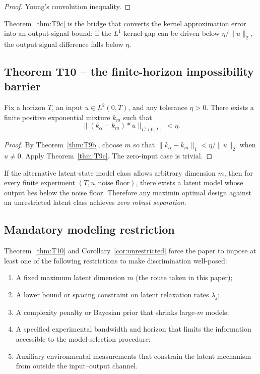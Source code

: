 \begin{proof}
Young's convolution inequality.
\end{proof}

Theorem~\ref{thm:T9c} is the bridge that converts the kernel approximation error into an output-signal bound: if the \(L^1\) kernel gap can be driven below \(\eta / \|u\|_2\), the output signal difference falls below \(\eta\).

\subsection{Theorem T10 -- the finite-horizon impossibility barrier}

\begin{theorem}
\label{thm:T10}
Fix a horizon \(T\), an input \(u \in L^2(0,T)\), and any tolerance \(\eta > 0\). There exists a finite positive exponential mixture \(k_m\) such that
\[
\|(k_\alpha - k_m) * u\|_{L^2(0,T)} < \eta.
\]
\end{theorem}

\begin{proof}
By Theorem~\ref{thm:T9b}, choose \(m\) so that \(\|k_\alpha - k_m\|_1 < \eta / \|u\|_2\) when \(u \neq 0\). Apply Theorem~\ref{thm:T9c}. The zero-input case is trivial.
\end{proof}

\begin{corollary}
\label{cor:unrestricted}
If the alternative latent-state model class allows arbitrary dimension \(m\), then for every finite experiment \((T, u, \text{noise floor})\), there exists a latent model whose output lies below the noise floor. Therefore any maximin optimal design against an unrestricted latent class achieves \emph{zero robust separation}.
\end{corollary}

\subsection{Mandatory modeling restriction}

Theorem~\ref{thm:T10} and Corollary~\ref{cor:unrestricted} force the paper to impose at least one of the following restrictions to make discrimination well-posed:

\begin{enumerate}
    \item A fixed maximum latent dimension \(m\) (the route taken in this paper);
    \item A lower bound or spacing constraint on latent relaxation rates \(\lambda_j\);
    \item A complexity penalty or Bayesian prior that shrinks large-\(m\) models;
    \item A specified experimental bandwidth and horizon that limits the information accessible to the model-selection procedure;
    \item Auxiliary environmental measurements that constrain the latent mechanism from outside the input--output channel.
\end{enumerate}

